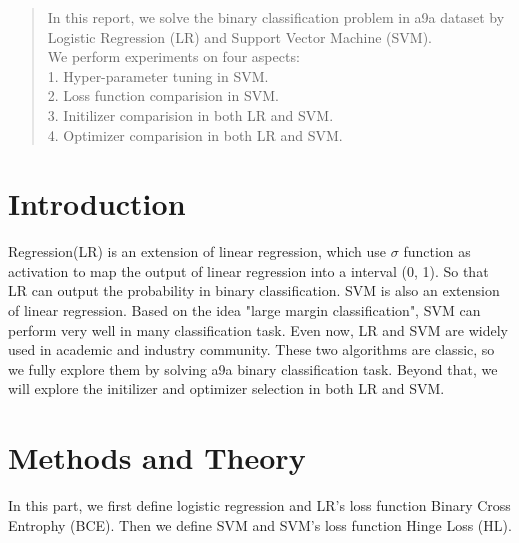 \documentclass[journal, a4paper]{IEEEtran}
\begin{document}
\begin{abstract}
In this report, we solve the binary classification problem in a9a dataset by Logistic Regression (LR) and Support Vector Machine (SVM). \\
We perform experiments on four aspects: \\
1. Hyper-parameter tuning in SVM. \\
2. Loss function comparision in SVM. \\
3. Initilizer comparision in both LR and SVM. \\
4. Optimizer comparision in both LR and SVM. \\
\end{abstract}

\section{Introduction}
 Regression(LR) is an extension of linear regression, which use $\sigma$ function as activation to map the output of linear regression into a interval (0, 1). So that LR can output the probability in binary classification. SVM is also an extension of linear regression. Based on the idea "large margin classification", SVM can perform very well in many classification task. Even now, LR and SVM are widely used in academic and industry community. These two algorithms are classic, so we fully explore them by solving a9a binary classification task. Beyond that, we will explore the initilizer and optimizer selection in both LR and SVM. 

\section{Methods and Theory}
In this part, we first define logistic regression and LR's loss function Binary Cross Entrophy (BCE). Then we define SVM and SVM's loss function Hinge Loss (HL).
\end{document}
